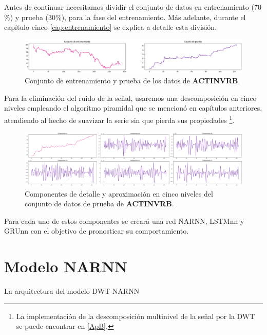Antes de continuar necesitamos dividir el conjunto de datos en entrenamiento (70$\%$) y prueba (30$\%$), para la fase del entrenamiento. Más adelante, durante el capítulo cinco \ref{cap:entrenamiento} se explica a detalle esta división.

\begin{figure}[h]
    \centering
    \includegraphics[width=1\textwidth]{Figuras/construccion_del_modelo/ACTINVR_entrenamiento_prueba.png}
    \caption{Conjunto de entrenamiento y prueba de los datos de \textbf{ACTINVRB}.} 
    \label{fig:ACTINVRB_entrenamiento_prueba}
\end{figure}

Para la eliminación del ruido de la señal, usaremos una descomposición en cinco niveles empleando el algoritmo piramidal que se mencionó en capítulos anteriores, atendiendo al hecho de suavizar la serie sin que pierda sus propiedades \footnote{La implementación de la descomposición multinivel de la señal por la DWT se puede encontrar en \ref{ApB}.}.

\begin{figure}[h]
    \centering
    \includegraphics[width=1\textwidth]{Figuras/construccion_del_modelo/ACTINVR_prueba_DWT_lvl5.png}
    \caption{Componentes de detalle y aproximación en cinco niveles del conjunto de datos de prueba de \textbf{ACTINVRB}.} 
    \label{fig:ACTINVRB_prueba_DWT_nivel1_5}
\end{figure}

Para cada uno de estos componentes se creará una red NARNN, LSTMnn y GRUnn con el objetivo de pronosticar su comportamiento.

\newpage

\section{Modelo NARNN}

La arquitectura del modelo DWT-NARNN

